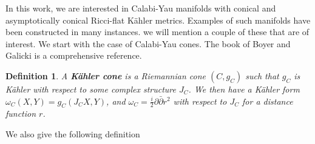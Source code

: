 \documentclass[a4paper,11pt]{article}
\newcounter{mythm}[section]
\newtheorem{defi}[mythm]{Definition}
\begin{document}
In this work, we are interested in Calabi-Yau manifolds with conical and asymptotically conical Ricci-flat Kähler metrics. Examples of such manifolds have been constructed in many instances. we will mention a couple of these that are of interest. We start with the case of Calabi-Yau cones. The book of Boyer and Galicki \cite{boyer2007sasakian} is a comprehensive reference.
\begin{defi}
 A \textbf{Kähler cone } is a Riemannian cone $\left(C, g_C\right)$ such that $g_C$ is Kähler with respect to some complex structure $J_C$. We then have a Kähler form $\omega_C(X, Y)=g_C\left(J_C X, Y\right)$, and $\omega_C=\frac{i}{2} \partial \bar{\partial} r^2$ with respect to $J_C$ for a distance function $r$.
 \end{defi}
We also give the following definition 
\end{document}
